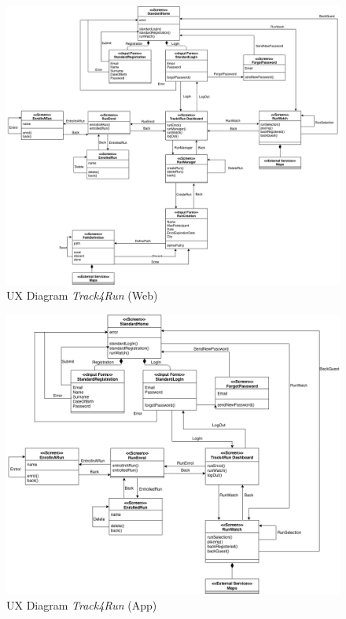 \begin{figure}[H]
  \begin{center}
  	\includegraphics[width=0.68\paperwidth]{./img/UXDiagram/UX_Diagram_Track4Run_Web.png}
    \hspace{0.05\linewidth}
    \centering
    \caption{UX Diagram \textit{Track4Run} (Web)}
		\label{img:Track4RunWeb}
    \end{center}
\end{figure}

\begin{figure}[H]
  \begin{center}
  	\includegraphics[width=0.68\paperwidth]{./img/UXDiagram/UX_Diagram_Track4Run_App.png}
    \hspace{0.05\linewidth}
    \centering
    \caption{UX Diagram \textit{Track4Run} (App)}
		\label{img:Track4RunApp}
    \end{center}
\end{figure}

